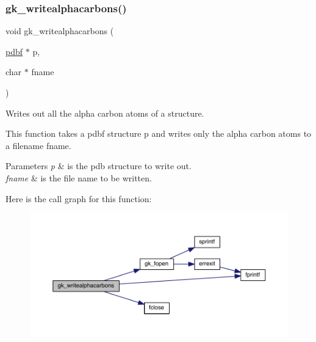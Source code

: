 \mbox{\label{a00077_ad0eef52d1d7e2da669accced22e821a4}} 
\subsubsection{\texorpdfstring{gk\+\_\+writealphacarbons()}{gk\_writealphacarbons()}}
{\footnotesize\ttfamily void gk\+\_\+writealphacarbons (\begin{DoxyParamCaption}\item[{\hyperlink{a00666}{pdbf} $\ast$}]{p,  }\item[{char $\ast$}]{fname }\end{DoxyParamCaption})}



Writes out all the alpha carbon atoms of a structure. 

This function takes a pdbf structure p and writes only the alpha carbon atoms to a filename fname.


\begin{DoxyParams}{Parameters}
{\em p} & is the pdb structure to write out. \\
\hline
{\em fname} & is the file name to be written. \\
\hline
\end{DoxyParams}
Here is the call graph for this function\+:\nopagebreak
\begin{figure}[H]
\begin{center}
\leavevmode
\includegraphics[width=350pt]{a00077_ad0eef52d1d7e2da669accced22e821a4_cgraph}
\end{center}
\end{figure}
\mbox{\label{a00077_a04817c574e29493f0363ef81b41f82df}} 
